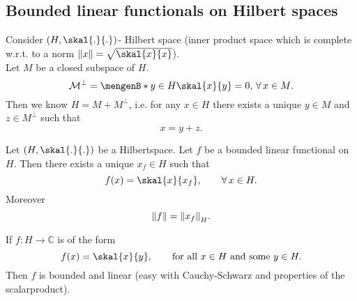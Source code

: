 

\subsection{Bounded linear functionals on Hilbert spaces} 
\label{sub:bounded_linear_functionals_on_hilbert_spaces}

Consider $(H, \skal{.}{.})$- Hilbert space (inner product space which is complete w.r.t. to a norm $\norm{x}= \sqrt{\skal{x}{x}}$). \\
Let $M$ be a closed subspace of $H$. 
\[
	\mathcal{M}^{\perp} = \set[y \in H]{\skal{x}{y}= 0, \, \forall\,  x \in M}.
\]
Then we know $H = M + M^{\perp}$, i.e. for any $x \in H$ there exists a unique $y \in M$ and $z \in M^{\perp}$ such that
\[
	x = y + z.
\]
\begin{theorem}
	Let $(H, \skal{.}{.})$ be a Hilbertspace. Let $f$ be a bounded linear functional on $H$. Then there exists a unique $x_f \in H$ such that
	\[
		f(x) = \skal{x}{x_f}, \qquad \forall\,  x \in H.
	\]
	Moreover \[
		\norm{f} = \norm{x_f}_H.
	\]
\end{theorem}
\begin{bemerkung}
	If $f: H \to \mathbb{C}$ is of the form
	\[
		f(x) = \skal{x}{y}, \qquad \text{for all } x \in H \text{ and some }y \in H.
	\]
	Then $f$ is bounded and linear (easy with Cauchy-Schwarz and properties of the scalarproduct).
\end{bemerkung}
